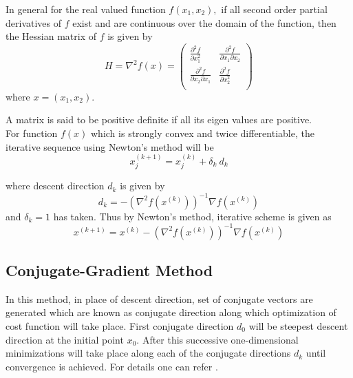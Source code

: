\documentclass[11pt]{article}
\numberwithin{equation}{section}
\begin{document}
In general for the real valued function $f(x_{1},x_2),$ if all second order partial derivatives of $f$ exist and are continuous over the domain of the function, then the Hessian matrix of $f$ is given by
\begin{equation}\label{e41}
H= {\nabla}^{2} {f(x)}=\left(\begin{array}{cccccc}
                              \frac{ \partial^{2}f}{\partial x_{1}^2} & \frac{ \partial^{2}f}{\partial x_{1}\partial x_{2}}  \\
                               \frac{ \partial^{2}f}{\partial x_{2}\partial x_{1}} &  \frac{ \partial^{2}f}{\partial x_{2}^2}  \\

                             \end{array}
                           \right)
\end{equation}
\newline
where $x = (x_1, x_2).$\newline

\noindent A matrix is said to be positive definite if all its eigen values are positive.\\
For function  $f(x)$ which is strongly convex and twice differentiable,
 the iterative sequence using Newton's method \cite{aw} will be
 \begin{equation}\label{e28}
 x_{j}^{(k+1)}=x_{j}^{(k)}+\delta_k~d_{k}
\end{equation}

where descent direction $d_{k}$ is given by
\begin{equation*}
    d_k = -(\nabla ^2 f(x^{(k)}))^{-1} \nabla f(x^{(k)})
\end{equation*}
and $\delta_k=1$ has taken. Thus by Newton's method, iterative scheme is given as
\begin{equation*}
   x^{(k+1)} = x^{(k)} - (\nabla ^2 f(x^{(k)}))^{-1} \nabla f(x^{(k)})
\end{equation*}



\subsection{Conjugate-Gradient Method}
In this method, in place of descent direction, set of conjugate vectors are generated which are known as conjugate direction along which optimization of cost function will take place. First conjugate direction $d_0$ will be steepest descent direction at the initial point $x_0$. After this successive one-dimensional minimizations will take place along each of the conjugate directions $d_k$ until convergence is achieved. For details one can refer \cite{aw,nw}.\\
\end{document}
